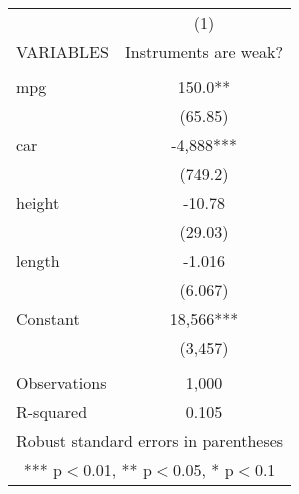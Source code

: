 \documentclass[]{article}
\begin{document}
\begin{tabular}{lc} \hline
 & (1) \\
VARIABLES & Instruments are weak? \\ \hline
 &  \\
mpg & 150.0** \\
 & (65.85) \\
car & -4,888*** \\
 & (749.2) \\
height & -10.78 \\
 & (29.03) \\
length & -1.016 \\
 & (6.067) \\
Constant & 18,566*** \\
 & (3,457) \\
 &  \\
Observations & 1,000 \\
 R-squared & 0.105 \\ \hline
\multicolumn{2}{c}{ Robust standard errors in parentheses} \\
\multicolumn{2}{c}{ *** p$<$0.01, ** p$<$0.05, * p$<$0.1} \\
\end{tabular}
\end{document}
